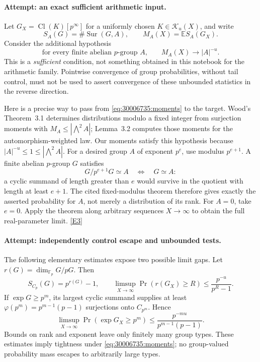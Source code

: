 \documentclass[11pt,a4paper]{article}
\newcommand{\F}{\mathbb{F}}
\newcommand{\E}{\mathbb{E}}
\newcommand{\eref}[2]{\hyperlink{extra:#1:#2}{[E#2]}}
\numberwithin{equation}{section}
\begin{document}
\paragraph{Attempt: an exact sufficient arithmetic input.}
Let $G_X=\operatorname{Cl}(K)[p^\infty]$ for a uniformly chosen
$K\in\mathcal K_u(X)$, and write
\[
 S_A(G)=\#\operatorname{Sur}(G,A),\qquad
 M_A(X)=\E S_A(G_X).
\]
Consider the additional hypothesis
\begin{equation}\label{eq:30006735:moments}
 \text{for every finite abelian $p$-group $A$,}\qquad
 M_A(X)\longrightarrow |A|^{-u}.
\end{equation}
This is a \emph{sufficient} condition, not something obtained in this
notebook for the arithmetic family. Pointwise convergence of group
probabilities, without tail control, must not be used to assert convergence
of these unbounded statistics in the reverse direction.

Here is a precise way to pass from \eqref{eq:30006735:moments} to the target.
Wood's Theorem~3.1 determines distributions modulo a fixed integer from
surjection moments with $M_A\leq|\bigwedge^2 A|$; Lemma~3.2 computes
those moments for the automorphism-weighted law. Our moments satisfy this
hypothesis because $|A|^{-u}\leq1\leq|\bigwedge^2 A|$.
For a desired group $A$ of exponent $p^e$, use modulus $p^{e+1}$.
A finite abelian $p$-group $G$ satisfies
\[
 G/p^{e+1}G\simeq A\quad\Longleftrightarrow\quad G\simeq A:
\]
a cyclic summand of length greater than $e$ would survive in the quotient
with length at least $e+1$. The cited fixed-modulus theorem therefore
gives exactly the asserted probability for $A$, not merely a distribution
of its rank. For $A=0$, take $e=0$. Apply the theorem along arbitrary
sequences $X\to\infty$ to obtain the full real-parameter limit.
\eref{30006735}{3}

\paragraph{Attempt: independently control escape and unbounded tests.}
The following elementary estimates expose two possible limit gaps.
Let $r(G)=\dim_{\F_p}G/pG$. Then
\[
 S_{C_p}(G)=p^{r(G)}-1,
 \qquad
 \limsup_{X\to\infty}\Pr(r(G_X)\geq R)
 \leq\frac{p^{-u}}{p^R-1}.
\]
If $\exp G\geq p^m$, its largest cyclic summand supplies at least
$\varphi(p^m)=p^{m-1}(p-1)$ surjections onto $C_{p^m}$. Hence
\begin{equation}\label{eq:30006735:tail}
 \limsup_{X\to\infty}\Pr(\exp G_X\geq p^m)
 \leq\frac{p^{-mu}}{p^{m-1}(p-1)}.
\end{equation}
Bounds on rank and exponent leave only finitely many group types. These
estimates imply tightness under \eqref{eq:30006735:moments}; no group-valued
probability mass escapes to arbitrarily large types.
\end{document}
